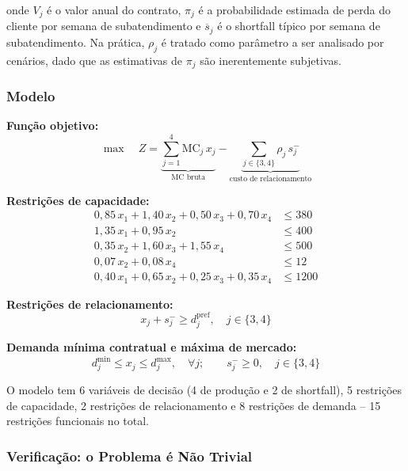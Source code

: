 onde $V_j$ é o valor anual do contrato, $\pi_j$ é a probabilidade estimada de
perda do cliente por semana de subatendimento e $\overline{s}_j$ é o shortfall
típico por semana de subatendimento. Na prática, $\rho_j$ é tratado como
parâmetro a ser analisado por cenários, dado que as estimativas de $\pi_j$ são
inerentemente subjetivas.

\subsubsection{Modelo}

\textbf{Função objetivo:}
\begin{equation}
  \max \quad Z = \underbrace{\sum_{j=1}^{4} \mathrm{MC}_j \, x_j}_{\text{MC bruta}}
                - \underbrace{\sum_{j \in \{3,4\}} \rho_j \, s_j^-}_{\text{custo de relacionamento}}
  \label{eq:fo_r2}
\end{equation}

\textbf{Restrições de capacidade:}
\begin{align}
  0{,}85\,x_1 + 1{,}40\,x_2 + 0{,}50\,x_3 + 0{,}70\,x_4 &\leq 380
    \tag{R1 -- Teares} \label{eq:tear}\\
  1{,}35\,x_1 + 0{,}95\,x_2 &\leq 400
    \tag{R2 -- Fio algodão} \\
  0{,}35\,x_2 + 1{,}60\,x_3 + 1{,}55\,x_4 &\leq 500
    \tag{R3 -- Fio poliéster} \\
  0{,}07\,x_2 + 0{,}08\,x_4 &\leq 12
    \tag{R4 -- Elastano} \\
  0{,}40\,x_1 + 0{,}65\,x_2 + 0{,}25\,x_3 + 0{,}35\,x_4 &\leq 1200
    \tag{R5 -- MOD}
\end{align}

\textbf{Restrições de relacionamento:}
\begin{equation}
  x_j + s_j^- \geq d_j^{\text{pref}}, \quad j \in \{3, 4\}
  \label{eq:soft}
\end{equation}

\textbf{Demanda mínima contratual e máxima de mercado:}
\begin{equation}
  d_j^{\min} \leq x_j \leq d_j^{\max}, \quad \forall j; \qquad
  s_j^- \geq 0, \quad j \in \{3,4\}
  \label{eq:dem}
\end{equation}

O modelo tem 6 variáveis de decisão (4 de produção e 2 de shortfall), 5
restrições de capacidade, 2 restrições de relacionamento e 8 restrições de
demanda -- 15 restrições funcionais no total.

\subsubsection{Verificação: o Problema é Não Trivial}

